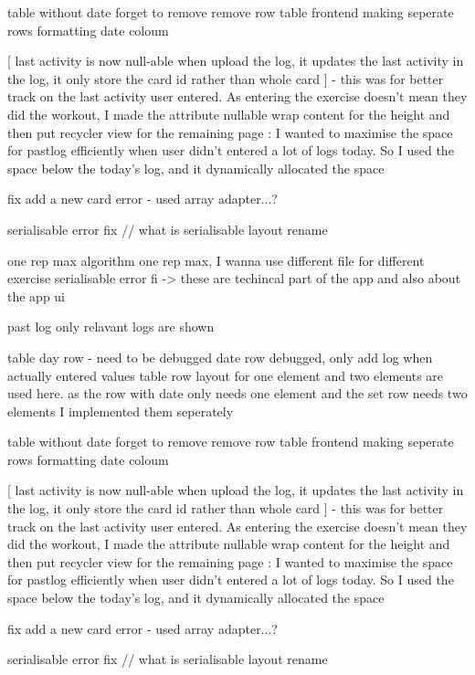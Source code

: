 table without date
forget to remove remove row
table frontend
making seperate rows
formatting date coloum

[
    last activity is now null-able
    when upload the log, it updates the last activity
    in the log, it only store the card id rather than whole card
] - this was for better track on the last activity user entered. As entering the exercise doesn't mean they did the workout, I made the attribute nullable
wrap content for the height and then put recycler view for the remaining page : I wanted to maximise the space for pastlog efficiently when user didn't entered a lot of logs today. So I used the space below the today's log, and it dynamically allocated the space


fix add a new card error - used array adapter...? 

serialisable error fix // what is serialisable
layout rename

one rep max algorithm
one rep max, I wanna use different file for different exercise
serialisable error fi
    -> these are techincal part of the app
    and also about the app ui 

past log
only relavant logs are shown

table day row - need to be debugged
date row debugged, only add log when actually entered values
    table row layout for one element and two elements are used here.
    as the row with date only needs one element 
    and the set row needs two elements
    I implemented them seperately

table without date
forget to remove remove row
table frontend
making seperate rows
formatting date coloum

[
    last activity is now null-able
    when upload the log, it updates the last activity
    in the log, it only store the card id rather than whole card
] - this was for better track on the last activity user entered. As entering the exercise doesn't mean they did the workout, I made the attribute nullable
wrap content for the height and then put recycler view for the remaining page : I wanted to maximise the space for pastlog efficiently when user didn't entered a lot of logs today. So I used the space below the today's log, and it dynamically allocated the space


fix add a new card error - used array adapter...? 

serialisable error fix // what is serialisable
layout rename

